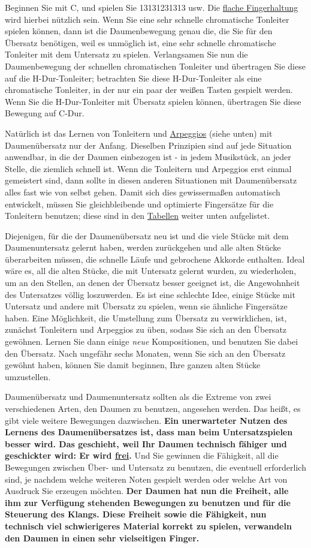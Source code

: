 Beginnen Sie mit C, und spielen Sie 13131231313 usw.
Die \hyperlink{c1iii4b}{flache Fingerhaltung} wird hierbei nützlich sein.
Wenn Sie eine sehr schnelle chromatische Tonleiter spielen können, dann ist die Daumenbewegung genau die, die Sie für den Übersatz benötigen, weil es unmöglich ist, eine sehr schnelle chromatische Tonleiter mit dem Untersatz zu spielen.
Verlangsamen Sie nun die Daumenbewegung der schnellen chromatischen Tonleiter und übertragen Sie diese auf die H-Dur-Tonleiter; betrachten Sie diese H-Dur-Tonleiter als eine chromatische Tonleiter, in der nur ein paar der weißen Tasten gespielt werden.
Wenn Sie die H-Dur-Tonleiter mit Übersatz spielen können, übertragen Sie diese Bewegung auf C-Dur.

Natürlich ist das Lernen von Tonleitern und \hyperlink{Arpeggios}{Arpeggios} (siehe unten) mit Daumenübersatz nur der Anfang.
Dieselben Prinzipien sind auf jede Situation anwendbar, in die der Daumen einbezogen ist - in jedem Musikstück, an jeder Stelle, die ziemlich schnell ist.
Wenn die Tonleitern und Arpeggios erst einmal gemeistert sind, dann sollte in diesen anderen Situationen mit Daumenübersatz alles fast wie von selbst gehen.
Damit sich dies gewissermaßen automatisch entwickelt, müssen Sie gleichbleibende und optimierte Fingersätze für die Tonleitern benutzen; diese sind in den \hyperlink{table}{Tabellen} weiter unten aufgelistet.

Diejenigen, für die der Daumenübersatz neu ist und die viele Stücke mit dem Daumenuntersatz gelernt haben, werden zurückgehen und alle alten Stücke überarbeiten müssen, die schnelle Läufe und gebrochene Akkorde enthalten.
Ideal wäre es, all die alten Stücke, die mit Untersatz gelernt wurden, zu wiederholen, um an den Stellen, an denen der Übersatz besser geeignet ist, die Angewohnheit des Untersatzes völlig loszuwerden.
Es ist eine schlechte Idee, einige Stücke mit Untersatz und andere mit Übersatz zu spielen, wenn sie ähnliche Fingersätze haben.
Eine Möglichkeit, die Umstellung zum Übersatz zu verwirklichen, ist, zunächst Tonleitern und Arpeggios zu üben, sodass Sie sich an den Übersatz gewöhnen.
Lernen Sie dann einige \textit{neue} Kompositionen, und benutzen Sie dabei den Übersatz.
Nach ungefähr sechs Monaten, wenn Sie sich an den Übersatz gewöhnt haben, können Sie damit beginnen, Ihre ganzen alten Stücke umzustellen.

Daumenübersatz und Daumenuntersatz sollten als die Extreme von zwei verschiedenen Arten, den Daumen zu benutzen, angesehen werden.
Das heißt, es gibt viele weitere Bewegungen dazwischen.
\textbf{Ein unerwarteter Nutzen des Lernens des Daumenübersatzes ist, dass man beim Untersatzspielen besser wird.
Das geschieht, weil Ihr Daumen technisch fähiger und geschickter wird: Er wird \underline{frei}.}
Und Sie gewinnen die Fähigkeit, all die Bewegungen zwischen Über- und Untersatz zu benutzen, die eventuell erforderlich sind, je nachdem welche weiteren Noten gespielt werden oder welche Art von Ausdruck Sie erzeugen möchten.
\textbf{Der Daumen hat nun die Freiheit, alle ihm zur Verfügung stehenden Bewegungen zu benutzen und für die Steuerung des Klangs.
Diese Freiheit sowie die Fähigkeit, nun technisch viel schwierigeres Material korrekt zu spielen, verwandeln den Daumen in einen sehr vielseitigen Finger.}


